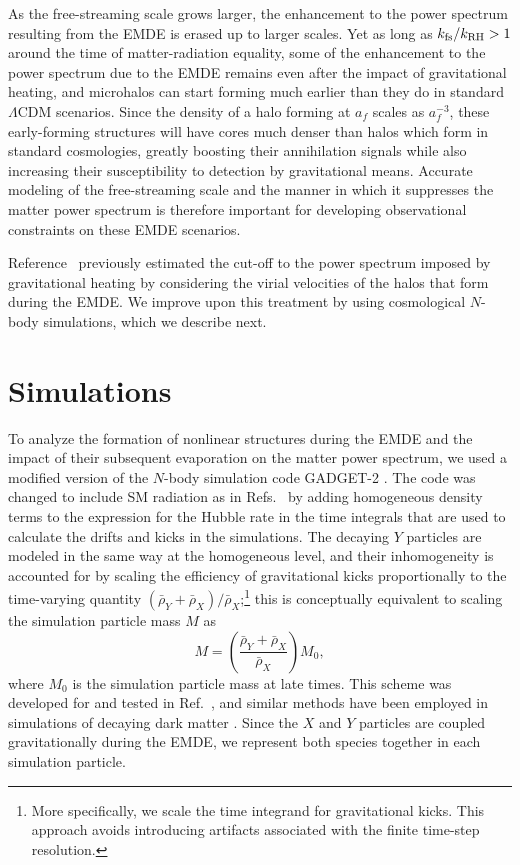 \documentclass[a4paper,11pt]{article}
\newcommand{\rh}[1]{{#1}_{\mathrm{RH}}}
\newcommand{\kfs}{k_{\rm fs}}
\begin{document}
As the free-streaming scale grows larger, the enhancement to the power spectrum resulting from the EMDE is erased up to larger scales. Yet as long as $\kfs / \rh{k} > 1$ around the time of matter-radiation equality, some of the enhancement to the power spectrum due to the EMDE remains even after the impact of gravitational heating, and microhalos can start forming much earlier than they do in standard $\Lambda$CDM scenarios. Since the density of a halo forming at $a_f$ scales as $a_f^{-3}$, these early-forming structures will have cores much denser than halos which form in standard cosmologies,
greatly boosting their annihilation signals while also increasing their susceptibility to detection by gravitational means. Accurate modeling of the free-streaming scale and the manner in which it suppresses the matter power spectrum is therefore important for developing observational constraints on these EMDE scenarios.

Reference~\cite{blanco19} previously estimated the cut-off to the power spectrum imposed by gravitational heating by considering the virial velocities of the halos that form during the EMDE. We improve upon this treatment by using cosmological $N$-body simulations, which we describe next.

\section{Simulations}
\label{simulations}

To analyze the formation of nonlinear structures during the EMDE and the impact of their subsequent evaporation on the matter power spectrum, we used a modified version of the $N$-body simulation code \textsc{GADGET-2} \cite{gadget2}. The code was changed to include SM radiation as in Refs.~\cite{sten_ucmh,sten_ucmh_prof} by adding homogeneous density terms to the expression for the Hubble rate in the time integrals that are used to calculate the drifts and kicks in the simulations. The decaying $Y$ particles are modeled in the same way at the homogeneous level, and their inhomogeneity is accounted for by scaling the efficiency of gravitational kicks proportionally to the time-varying quantity $(\bar{\rho}_Y + \bar{\rho}_X)/\bar{\rho}_X$;\footnote{More specifically, we scale the time integrand for gravitational kicks. This approach avoids introducing artifacts associated with the finite time-step resolution.} this is conceptually equivalent to scaling the simulation particle mass $M$ as
\begin{equation}
    M = \left( \frac{\bar{\rho}_Y + \bar{\rho}_X }{\bar{\rho}_X} \right) M_0,
\end{equation}
where $M_0$ is the simulation particle mass at late times. This scheme was developed for and tested in Ref.~\cite{blanco19}, and similar methods have been employed in simulations of decaying dark matter \cite{suto87,enqvist15,dakin19}. Since the $X$ and $Y$ particles are coupled gravitationally during the EMDE, we represent both species together in each simulation particle.
\end{document}

